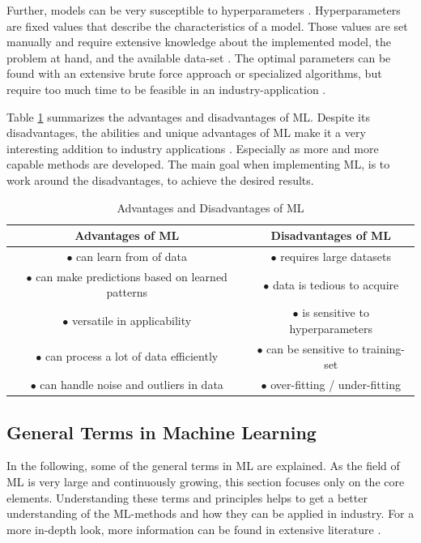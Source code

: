 Further, models can be very susceptible to hyperparameters \cite{Janiesch}. Hyperparameters are fixed values that describe the characteristics of a model. Those values are set manually and require extensive knowledge about the implemented model, the problem at hand, and the available data-set \cite{Luo}. The optimal parameters can be found with an extensive brute force approach or specialized algorithms, but require too much time to be feasible in an industry-application \cite{Claesen}. 

Table \ref{AdDis} summarizes the advantages and disadvantages of ML. Despite its disadvantages, the abilities and unique advantages of ML make it a very interesting addition to industry applications \cite{Bertolini}. Especially as more and more capable methods are developed. The main goal when implementing ML, is to work around the disadvantages, to achieve the desired results.


\begin{table}
	\begin{center}
	\begin{tabular}{|| c | c ||}
		\hline
		\rule{0pt}{2ex}
		 Advantages of ML & Disadvantages of ML \\
		\hline
				\rule{0pt}{2ex} 
		$\bullet$ can learn from of data & $\bullet$ requires large datasets \\
		$\bullet$ can make predictions based on learned patterns & $\bullet$ data is tedious to acquire\\	
		$\bullet$ versatile in applicability & $\bullet$ is sensitive to hyperparameters\\
		$\bullet$ can process a lot of data efficiently & $\bullet$ can be sensitive to training-set\\
		$\bullet$ can handle noise and outliers in data & $\bullet$ over-fitting / under-fitting\\
		\hline
	\end{tabular}
	\caption{Advantages and Disadvantages of ML}
	\label{AdDis}
\end{center}
\vspace{-4mm}
\end{table}

\subsection{General Terms in Machine Learning}
In the following, some of the general terms in ML are explained. As the field of ML is very large and continuously growing, this section focuses only on the core elements. Understanding these terms and principles helps to get a better understanding of the ML-methods and how they can be applied in industry. For a more in-depth look, more information can be found in extensive literature \cite{Theodoridis, Bishop, google}.

